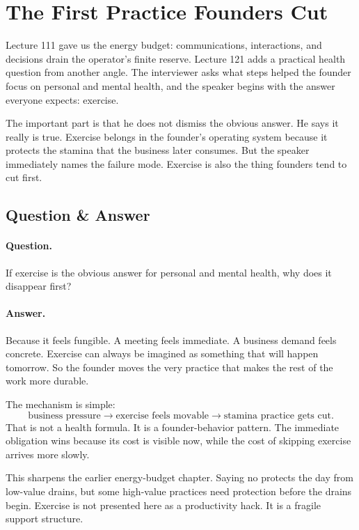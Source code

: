 \documentclass[11pt,oneside]{book}
\begin{document}
\section{The First Practice Founders Cut}

Lecture 111 gave us the energy budget: communications, interactions, and decisions drain the operator's finite reserve. Lecture 121 adds a practical health question from another angle. The interviewer asks what steps helped the founder focus on personal and mental health, and the speaker begins with the answer everyone expects: exercise.

The important part is that he does not dismiss the obvious answer. He says it really is true. Exercise belongs in the founder's operating system because it protects the stamina that the business later consumes. But the speaker immediately names the failure mode. Exercise is also the thing founders tend to cut first.

\subsection{Question \& Answer}

\paragraph{Question.}
If exercise is the obvious answer for personal and mental health, why does it disappear first?

\paragraph{Answer.}
Because it feels fungible. A meeting feels immediate. A business demand feels concrete. Exercise can always be imagined as something that will happen tomorrow. So the founder moves the very practice that makes the rest of the work more durable.

The mechanism is simple:
\[
\text{business pressure}
\longrightarrow
\text{exercise feels movable}
\longrightarrow
\text{stamina practice gets cut}.
\]
That is not a health formula. It is a founder-behavior pattern. The immediate obligation wins because its cost is visible now, while the cost of skipping exercise arrives more slowly.

This sharpens the earlier energy-budget chapter. Saying no protects the day from low-value drains, but some high-value practices need protection before the drains begin. Exercise is not presented here as a productivity hack. It is a fragile support structure.
\end{document}
